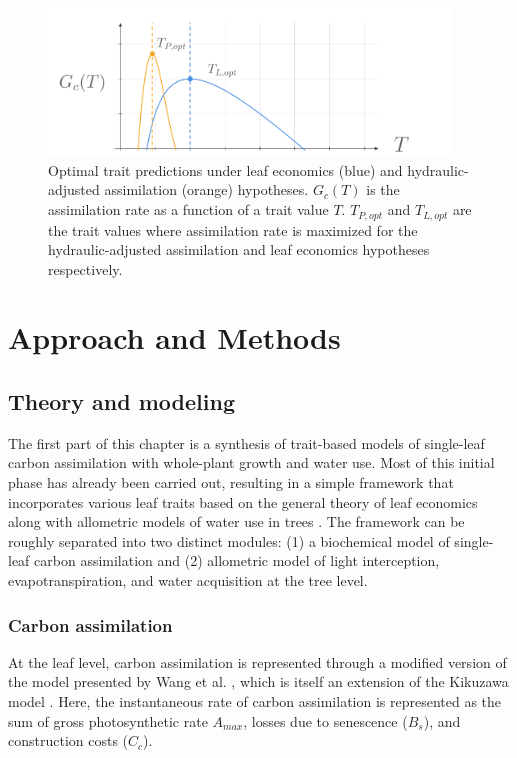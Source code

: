 \begin{figure}[h!]
    \centering
    \includegraphics[width=0.95\textwidth]{figures/pred.png} 
    \caption{Optimal trait predictions under leaf economics (blue) and hydraulic-adjusted assimilation (orange) hypotheses. $G_c(T)$ is the assimilation rate as a function of a trait value $T$. $T_{P,opt}$ and $T_{L,opt}$ are the trait values where assimilation rate is maximized for the hydraulic-adjusted assimilation and leaf economics hypotheses respectively.}
    \label{fig:pred}
\end{figure} 

\section{Approach and Methods}

\subsection{Theory and modeling}
The first part of this chapter is a synthesis of trait-based models of single-leaf carbon assimilation with whole-plant growth and water use. Most of this initial phase has already been carried out, resulting in a simple framework that incorporates various leaf traits based on the general theory of leaf economics \cite{wang2023a, wang2017a, kikuzawa_cost-benefit_1991} along with allometric models of water use in trees \cite{kempes2011a}. The framework can be roughly separated into two distinct modules: (1) a biochemical model of single-leaf carbon assimilation and (2) allometric model of light interception, evapotranspiration, and water acquisition at the tree level. 

\subsubsection{Carbon assimilation}

At the leaf level, carbon assimilation is represented through a modified version of the model presented by Wang et al. \cite{wang2023a}, which is itself an extension of the Kikuzawa model \cite{kikuzawa_cost-benefit_1991}. Here, the instantaneous rate of carbon assimilation is represented as the sum of gross photosynthetic rate $A_{max}$, losses due to senescence ($B_{s}$), and construction costs ($C_c$).

